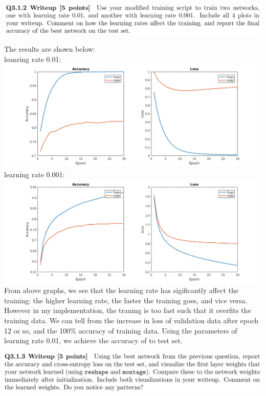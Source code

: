 \documentclass[12pt,letterpaper,boxed]{hmcpset}
\begin{document}
\begin{problem}[]
\includegraphics[width=\textwidth]{3_1_2.png}
\end{problem}

\begin{solution}
The results are shown below:\\
leanring rate 0.01:\\
\includegraphics[width=\textwidth]{3_1_2_1.png}\\
learning rate 0.001:\\
\includegraphics[width=\textwidth]{3_1_2_2.png}\\
From above graphs, we see that the learning rate has sigificantly affect the training: the higher
learning rate, the faster the training goes, and vice versa. However in my implementation, the traning is too fast such
that it overfits the training data. We can tell from the increase in loss of validation data after epoch 12 or so, 
and the 100\% accuracy of training data. Using the parameters of learning rate 0.01, we achieve the accuracy
of  to test set.
\end{solution}
\newpage

\begin{problem}[]
\includegraphics[width=\textwidth]{3_1_3.png}
\end{problem}
\end{document}
